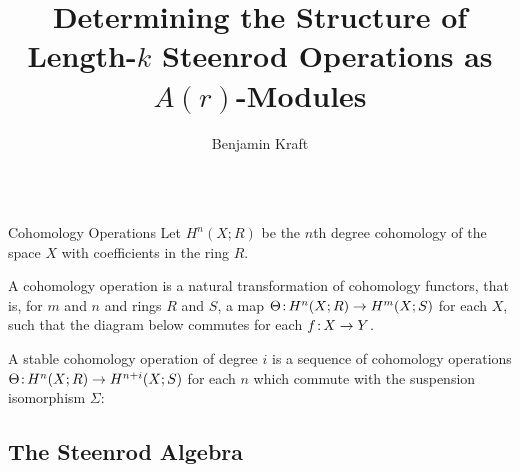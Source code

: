 \documentclass[final]{beamer}
\title{Determining the Structure of Length-$k$ Steenrod Operations as $A(r)$-Modules}
\author{Benjamin Kraft}
\institute{Massachusetts Institute of Technology}
\newcommand{\fr}{\nobreak\mskip2mu\mathpunct{}\nonscript\mkern-\thinmuskip{:}\mskip3mu\relax}
\begin{document}
  \begin{columns}[T]
    \begin{column}{0.245\textwidth} %
      \begin{block}{Cohomology Operations} %
        Let $H^n(X;R)$ be the $n$th degree cohomology of the space $X$ with coefficients in the ring $R$.
        \begin{bulletitem}
          A \alert{cohomology operation} is a natural transformation of cohomology functors, that is, for $m$ and $n$ and rings $R$ and $S$, a map $\Theta\fr H^n(X;R)\to H^m(X;S)$ for each $X$, such that the diagram below commutes for each $f\fr X\to Y$.
        \end{bulletitem}
        \begin{center}
          \vspace{-0.4em}
          \vspace{-0.4em}
        \end{center}
        \begin{bulletitem}
          A \alert{stable cohomology operation} of degree $i$ is a sequence of cohomology operations $\Theta\fr H^n(X;R)\to H^{n+i}(X;S)$ for each $n$ which commute with the suspension isomorphism $\Sigma$:
        \end{bulletitem}
        \begin{center}
          \vspace{-0.4em}
          \vspace{-0.4em}
        \end{center}
      \end{block}
      \subsection{The Steenrod Algebra}


\end{column}
\end{columns}
\end{document}
